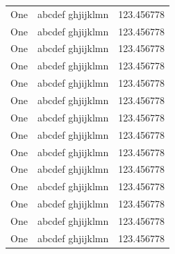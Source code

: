 \begin{longtable}{|l|l|l|}
One & abcdef ghjijklmn & 123.456778 \\
One & abcdef ghjijklmn & 123.456778 \\
One & abcdef ghjijklmn & 123.456778 \\
One & abcdef ghjijklmn & 123.456778 \\
One & abcdef ghjijklmn & 123.456778 \\
One & abcdef ghjijklmn & 123.456778 \\
One & abcdef ghjijklmn & 123.456778 \\
One & abcdef ghjijklmn & 123.456778 \\
One & abcdef ghjijklmn & 123.456778 \\
One & abcdef ghjijklmn & 123.456778 \\
One & abcdef ghjijklmn & 123.456778 \\
One & abcdef ghjijklmn & 123.456778 \\
One & abcdef ghjijklmn & 123.456778 \\
One & abcdef ghjijklmn & 123.456778 \\
\end{longtable}
